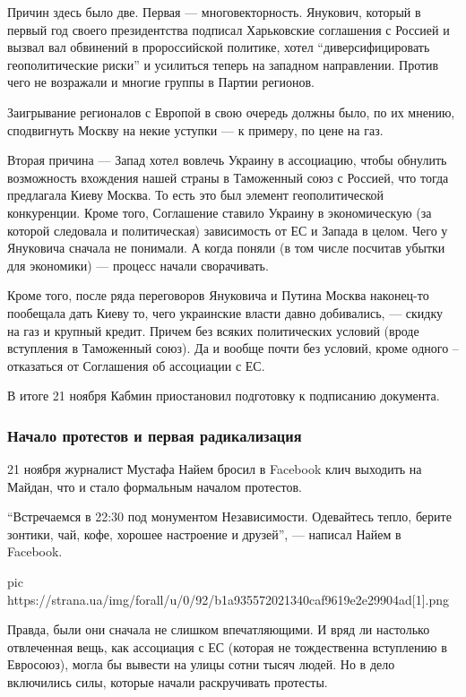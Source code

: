 Причин здесь было две. Первая --- многовекторность. Янукович, который в первый
год своего президентства подписал Харьковские соглашения с Россией и вызвал вал
обвинений в пророссийской политике, хотел \enquote{диверсифицировать геополитические
риски} и усилиться теперь на западном направлении. Против чего не возражали и
многие группы в Партии регионов. 

Заигрывание регионалов с Европой в свою очередь должны было, по их мнению,
сподвигнуть Москву на некие уступки --- к примеру, по цене на газ. 

Вторая причина --- Запад хотел вовлечь Украину в ассоциацию, чтобы обнулить
возможность вхождения нашей страны в Таможенный союз с Россией, что тогда
предлагала Киеву Москва. То есть это был элемент геополитической
конкуренции. Кроме того, Соглашение ставило Украину в экономическую (за
которой следовала и политическая) зависимость от ЕС и Запада в целом. Чего
у Януковича сначала не понимали. А когда поняли (в том числе посчитав
убытки для экономики) --- процесс начали сворачивать. 

Кроме того, после ряда переговоров Януковича и Путина Москва наконец-то
пообещала дать Киеву то, чего украинские власти давно добивались, --- скидку
на газ и крупный кредит. Причем без всяких политических условий (вроде
вступления в Таможенный союз). Да и вообще почти без условий, кроме одного
– отказаться от Соглашения об ассоциации с ЕС.

В итоге 21 ноября Кабмин приостановил подготовку к подписанию документа. 

\subsubsection{Начало протестов и первая радикализация}

21 ноября журналист Мустафа Найем бросил в Facebook клич выходить на
Майдан, что и стало формальным началом протестов. 

\enquote{Встречаемся в 22:30 под монументом Независимости. Одевайтесь тепло,
берите зонтики, чай, кофе, хорошее настроение и друзей}, --- написал Найем в
Facebook.

\ifcmt
pic https://strana.ua/img/forall/u/0/92/b1a935572021340caf9619e2e29904ad[1].png
\fi

Правда, были они сначала не слишком впечатляющими. И вряд ли настолько
отвлеченная вещь, как ассоциация с ЕС (которая не тождественна вступлению
в Евросоюз), могла бы вывести на улицы сотни тысяч людей. Но в дело
включились силы, которые начали раскручивать протесты. 


